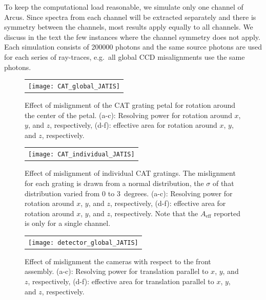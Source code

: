 \documentclass[12pt]{spieman}  %
\begin{document}
\begin{spacing}{1}
To keep the computational load reasonable, we simulate only one channel of Arcus. Since spectra from each channel will be extracted separately and there is symmetry between the channels, most results apply equally to all channels. We discuss in the text the few instances where the channel symmetry does not apply.
Each simulation consists of 200000 photons and the same source photons are used for each series of ray-traces, e.g.\ all global CCD misalignments use the same photons.

\begin{figure} [ht]
    \begin{center}
    \begin{tabular}{c} %
    \texttt{[image: CAT\_global\_JATIS]}
    \end{tabular}
    \end{center}
    \caption {\label{fig:CAT_global}
    Effect of mislignment of the CAT grating petal for rotation around the center of the petal. (a-c): Resolving power for rotation around $x$, $y$, and $z$, respectively, (d-f): effective area for rotation around $x$, $y$, and $z$, respectively.
    }
\end{figure}
\begin{figure} [ht]
    \begin{center}
    \begin{tabular}{c} %
    \texttt{[image: CAT\_individual\_JATIS]}
    \end{tabular}
    \end{center}
    \caption {\label{fig:CAT_individual}
    Effect of mislignment of individual CAT gratings. The mislignment for each grating is drawn from a normal distribution, the $\sigma$ of that distribution varied from 0 to 3~degrees. (a-c): Resolving power for rotation around $x$, $y$, and $z$, respectively, (d-f): effective area for rotation around $x$, $y$, and $z$, respectively. Note that the $A_\mathrm{eff}$ reported is only for a single channel.
    }
\end{figure}
\begin{figure} [ht]
    \begin{center}
    \begin{tabular}{c} %
    \texttt{[image: detector\_global\_JATIS]}
    \end{tabular}
    \end{center}
    \caption {\label{fig:detector_global}
    Effect of mislignment the cameras with respect to the front assembly. (a-c): Resolving power for translation parallel to $x$, $y$, and $z$, respectively, (d-f): effective area for translation parallel to $x$, $y$, and $z$, respectively.
    }
\end{figure}


\end{spacing}
\end{document}
